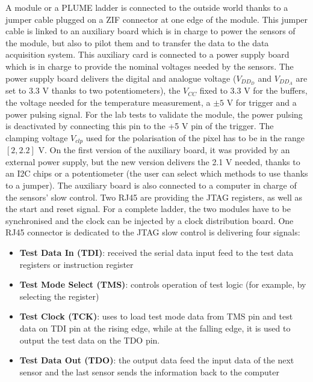   A module or a PLUME ladder is connected to the outside world thanks to a jumper cable plugged on a ZIF connector at one edge of the module.
  This jumper cable is linked to an auxiliary board which is in charge to power the sensors of the module, but also to pilot them and to transfer the data to the data acquisition system.
  This auxiliary card is connected to a power supply board which is in charge to provide the nominal voltages needed by the sensors.
  The power supply board delivers the digital and analogue voltage ($V_{DD_D}$ and $V_{DD_A}$ are set to 3.3 V thanks to two potentiometers), the $V_{CC}$ fixed to 3.3 V for the buffers, the voltage needed for the temperature measurement, a $\pm 5$ V for trigger and a power pulsing signal.
  For the lab tests to validate the module, the power pulsing is deactivated by connecting this pin to the +5 V pin of the trigger.
  The clamping voltage $V_{clp}$ used for the polarisation of the pixel has to be in the range $\left[2, 2.2\right]$ V.
  On the first version of the auxiliary board, it was provided by an external power supply, but the new version delivers the 2.1 V needed, thanks to an I2C chips or a potentiometer (the user can select which methods to use thanks to a jumper).
  The auxiliary board is also connected to a computer in charge of the sensors' slow control.
  Two RJ45 are providing the JTAG registers, as well as the start and reset signal. 
  For a complete ladder, the two modules have to be synchronised and the clock can be injected by a clock distribution board.
  One RJ45 connector is dedicated to the JTAG slow control is delivering four signals: 

  \begin{itemize}
    \item \textbf{Test Data In (TDI)}: received the serial data input feed to the test data registers or instruction register
    \item \textbf{Test Mode Select (TMS)}: controls operation of test logic (for example, by selecting the register)
    \item \textbf{Test Clock (TCK)}: uses to load test mode data from TMS pin and test data on TDI pin at the rising edge, while at the falling edge, it is used to output the test data on the TDO pin.
    \item \textbf{Test Data Out (TDO)}: the output data feed the input data of the next sensor and the last sensor sends the information back to the computer 
  \end{itemize}

